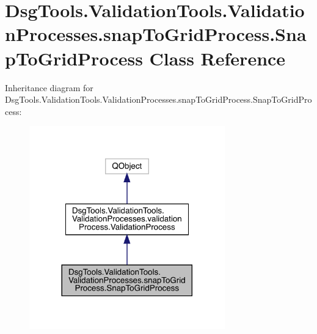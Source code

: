 \hypertarget{class_dsg_tools_1_1_validation_tools_1_1_validation_processes_1_1snap_to_grid_process_1_1_snap_to_grid_process}{}\section{Dsg\+Tools.\+Validation\+Tools.\+Validation\+Processes.\+snap\+To\+Grid\+Process.\+Snap\+To\+Grid\+Process Class Reference}
\label{class_dsg_tools_1_1_validation_tools_1_1_validation_processes_1_1snap_to_grid_process_1_1_snap_to_grid_process}


Inheritance diagram for Dsg\+Tools.\+Validation\+Tools.\+Validation\+Processes.\+snap\+To\+Grid\+Process.\+Snap\+To\+Grid\+Process\+:
\nopagebreak
\begin{figure}[H]
\begin{center}
\leavevmode
\includegraphics[width=240pt]{class_dsg_tools_1_1_validation_tools_1_1_validation_processes_1_1snap_to_grid_process_1_1_snap_to_grid_process__inherit__graph}
\end{center}
\end{figure}


